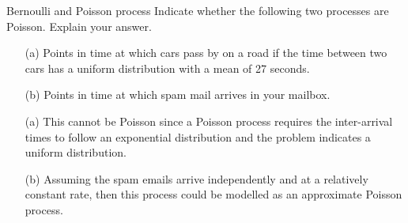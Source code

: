 \begin{problem}{Bernoulli and Poisson process}
Indicate whether the following two processes are Poisson. Explain your answer.
\begin{itemize}
\item[(a)] Points in time at which cars pass by on a road if the time between two cars has a uniform distribution with a mean of 27 seconds.
\item[(b)] Points in time at which spam mail arrives in your mailbox.
\end{itemize}
\end{problem}

\begin{solution}
\begin{itemize}
\item[(a)] This cannot be Poisson since a Poisson process requires the inter-arrival times to follow an exponential distribution and the problem indicates a uniform distribution.
\item[(b)] Assuming the spam emails arrive independently and at a relatively constant rate, then this process could be modelled as an approximate Poisson process. 
\end{itemize}
\end{solution}
